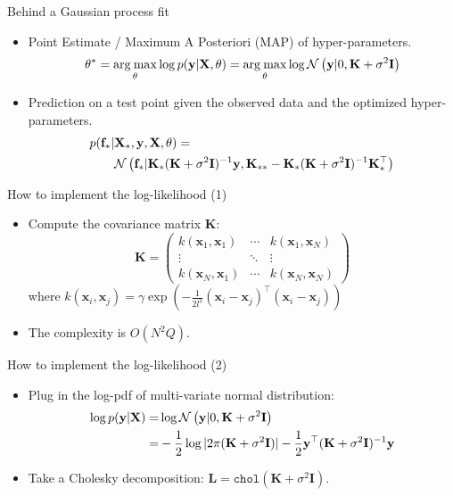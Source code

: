 \documentclass[14pt,aspectratio=1610]{beamer}
\newcommand{\yV}{\mathbf{y}}
\newcommand{\fV}{\mathbf{f}}
\newcommand{\xM}{\mathbf{X}}
\newcommand{\xV}{\mathbf{x}}
\newcommand{\K}{\mathbf{K}}
\renewcommand{\L}{\mathbf{L}}
\newcommand{\I}{\mathbf{I}}
\newcommand{\argmax}{\operatorname*{arg\: max}}
\begin{document}
\begin{frame}{Behind a Gaussian process fit}
\begin{itemize}

\item Point Estimate / Maximum A Posteriori (MAP) of hyper-parameters.
%
\[
\theta^* = \argmax_{\theta} \log p(\yV|\xM, \theta) = \argmax_{\theta} \log \gaussianDist{\yV}{0}{\K+\sigma^2\I}
\]

\item Prediction on a test point given the observed data and the optimized hyper-parameters.
\begin{align*}
p(\fV_* | &\xM_*, \yV, \xM, \theta) = \\
& \gaussianDist{\fV_*}{\K_* (\K+\sigma^2\I)^{-1} \yV}{\K_{**} - \K_* (\K+\sigma^2\I)^{-1} \K_*^\top}
\end{align*}

\end{itemize}
\end{frame}

\begin{frame}{How to implement the log-likelihood (1)}
\begin{itemize}
\item Compute the covariance matrix $\K$:
\[\K = 
 \begin{pmatrix}
  k(\xV_1, \xV_1) & \cdots & k(\xV_1, \xV_N) \\
  \vdots  &  \ddots & \vdots  \\
  k(\xV_N, \xV_1) & \cdots & k(\xV_N, \xV_N) 
 \end{pmatrix}
 \]
where $k(\xV_i, \xV_j) = \gamma \exp\left(-\frac{1}{2l^2}(\xV_i - \xV_j)^\top(\xV_i - \xV_j)\right)$
\vspace{5mm}
\item The complexity is $O(N^2Q)$.
\end{itemize}
\end{frame}

\begin{frame}{How to implement the log-likelihood (2)}
\begin{itemize}
\item Plug in the log-pdf of multi-variate normal distribution:
\begin{align*}
\log p(\yV|\xM) =&  \log \gaussianDist{\yV}{0}{\K+\sigma^2\I}\\
=& -\frac{1}{2}\log |2\pi (\K+\sigma^2\I)| - \frac{1}{2} \yV^\top (\K+\sigma^2\I)^{-1} \yV
\end{align*}
\item Take a Cholesky decomposition: $\L = \mathtt{chol}(\K+\sigma^2\I )$.
\end{itemize}
\end{frame}
\end{document}

